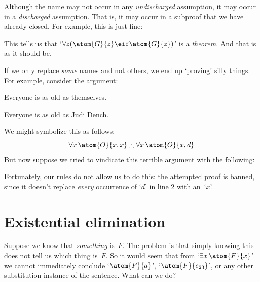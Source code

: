 Although the name may not occur in any \emph{undischarged} assumption, it may occur in a \emph{discharged} assumption. That is, it may occur in a subproof that we have already closed. For example, this is just fine:
\begin{fitchproof}
	\open
		\AS
	\close
\end{fitchproof}
This tells us that `$\forall z (\atom{G}{z} \eif \atom{G}{z})$' is a \emph{theorem}. And that is as it should be.

If we only replace \emph{some} names and not others, we end up
`proving' silly things. For example, consider the argument:
	\begin{earg}
	\item Everyone is as old as themselves.
	\item[\texttherefore] Everyone is as old as Judi Dench.
	\end{earg}
We might symbolize this as follows:
$$\forall x\,\atom{O}{x,x} \therefore \forall x\,\atom{O}{x,d}$$
But now suppose we tried to vindicate this terrible argument with the following:
\begin{fitchproof}
	\PR
\end{fitchproof}
Fortunately, our rules do not allow us to do this: the attempted proof
is banned, since it doesn't replace \emph{every} occurrence of `$d$'
in line $2$ with an~`$x$'.

\section{Existential elimination}\label{s:existsElim}

Suppose we know that \emph{something} is~$F$. The problem is that simply knowing this does not tell us which thing is~$F$. So it would seem that from `$\exists x\,\atom{F}{x}$' we cannot immediately conclude `$\atom{F}{a}$', `$\atom{F}{e_{23}}$', or any other substitution instance of the sentence. What can we do?

